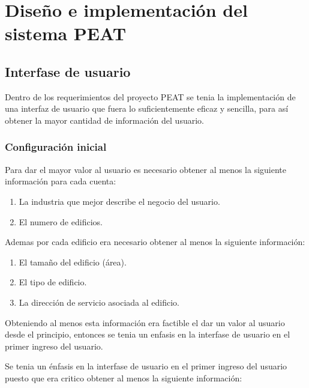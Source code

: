 \chapter{Diseño e implementación del sistema PEAT}
\section{Interfase de usuario}
Dentro de los requerimientos del proyecto PEAT se tenia la implementación de una
interfaz de usuario que fuera lo suficientemente eficaz y sencilla, para así obtener
la mayor cantidad de información del usuario.

\subsection{Configuración inicial}
Para dar el mayor valor al usuario es necesario obtener al menos la siguiente información
para cada cuenta:

\begin{enumerate}
\item La industria que mejor describe el negocio del usuario.
\item El numero de edificios.
\end{enumerate}

Ademas por cada edificio era necesario obtener al menos la siguiente información:

\begin{enumerate}
\item El tamaño del edificio (área).
\item El tipo de edificio.
\item La dirección de servicio asociada al edificio.
\end{enumerate}

Obteniendo al menos esta información era factible el dar un valor al usuario desde el
principio, entonces se tenia un enfasis en la interfase de usuario en el primer ingreso
del usuario.

Se tenia un énfasis en la interfase de usuario en el primer ingreso del usuario puesto
que era critico obtener al menos la siguiente información:

\begin{usecase}
\end{usecase}
